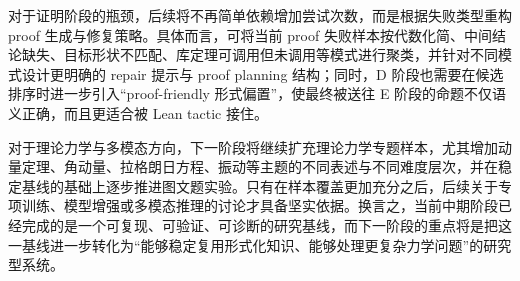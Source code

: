 \documentclass[12pt,a4paper]{ctexart}
\begin{document}
对于证明阶段的瓶颈，后续将不再简单依赖增加尝试次数，而是根据失败类型重构 proof 生成与修复策略。具体而言，可将当前 proof 失败样本按代数化简、中间结论缺失、目标形状不匹配、库定理可调用但未调用等模式进行聚类，并针对不同模式设计更明确的 repair 提示与 proof planning 结构；同时，D 阶段也需要在候选排序时进一步引入“proof-friendly 形式偏置”，使最终被送往 E 阶段的命题不仅语义正确，而且更适合被 Lean tactic 接住。

对于理论力学与多模态方向，下一阶段将继续扩充理论力学专题样本，尤其增加动量定理、角动量、拉格朗日方程、振动等主题的不同表述与不同难度层次，并在稳定基线的基础上逐步推进图文题实验。只有在样本覆盖更加充分之后，后续关于专项训练、模型增强或多模态推理的讨论才具备坚实依据。换言之，当前中期阶段已经完成的是一个可复现、可验证、可诊断的研究基线，而下一阶段的重点将是把这一基线进一步转化为“能够稳定复用形式化知识、能够处理更复杂力学问题”的研究型系统。
\end{document}
